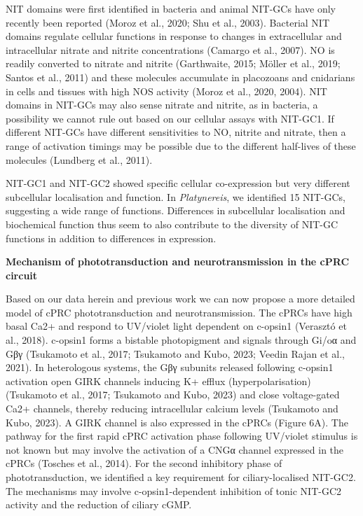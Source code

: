 \documentclass[
  10pt,
  onecolumn]{article}
\begin{document}
NIT domains were first identified in bacteria and animal NIT-GCs have
only recently been reported (Moroz et al., 2020; Shu et al., 2003).
Bacterial NIT domains regulate cellular functions in response to changes
in extracellular and intracellular nitrate and nitrite concentrations
(Camargo et al., 2007). NO is readily converted to nitrate and nitrite
(Garthwaite, 2015; Möller et al., 2019; Santos et al., 2011) and these
molecules accumulate in placozoans and cnidarians in cells and tissues
with high NOS activity (Moroz et al., 2020, 2004). NIT domains in
NIT-GCs may also sense nitrate and nitrite, as in bacteria, a
possibility we cannot rule out based on our cellular assays with
NIT-GC1. If different NIT-GCs have different sensitivities to NO,
nitrite and nitrate, then a range of activation timings may be possible
due to the different half-lives of these molecules (Lundberg et al.,
2011).

NIT-GC1 and NIT-GC2 showed specific cellular co-expression but very
different subcellular localisation and function. In \emph{Platynereis},
we identified 15 NIT-GCs, suggesting a wide range of functions.
Differences in subcellular localisation and biochemical function thus
seem to also contribute to the diversity of NIT-GC functions in addition
to differences in expression.

\textbf{Mechanism of phototransduction and neurotransmission in the cPRC
circuit}

Based on our data herein and previous work we can now propose a more
detailed model of cPRC phototransduction and neurotransmission. The
cPRCs have high basal Ca2+ and respond to UV/violet light dependent on
c-opsin1 (Verasztó et al., 2018). c-opsin1 forms a bistable photopigment
and signals through Gi/oα and Gβγ (Tsukamoto et al., 2017; Tsukamoto and
Kubo, 2023; Veedin Rajan et al., 2021). In heterologous systems, the Gβγ
subunits released following c-opsin1 activation open GIRK channels
inducing K+ efflux (hyperpolarisation) (Tsukamoto et al., 2017;
Tsukamoto and Kubo, 2023) and close voltage-gated Ca2+ channels, thereby
reducing intracellular calcium levels (Tsukamoto and Kubo, 2023). A GIRK
channel is also expressed in the cPRCs (Figure 6A). The pathway for the
first rapid cPRC activation phase following UV/violet stimulus is not
known but may involve the activation of a CNGα channel expressed in the
cPRCs (Tosches et al., 2014). For the second inhibitory phase of
phototransduction, we identified a key requirement for ciliary-localised
NIT-GC2. The mechanisms may involve c-opsin1-dependent inhibition of
tonic NIT-GC2 activity and the reduction of ciliary cGMP.
\end{document}
